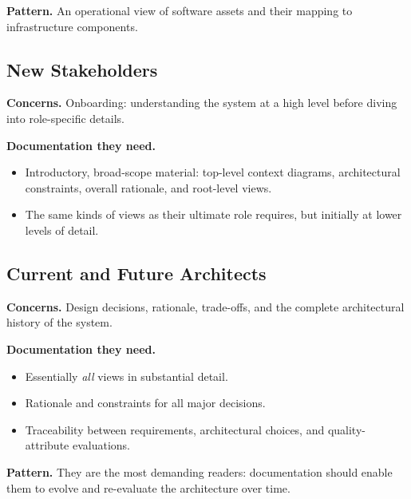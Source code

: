 \documentclass[11pt]{article}
\begin{document}
\noindent
\textbf{Pattern.} An operational view of software assets and their mapping to infrastructure components.

\subsection{New Stakeholders}

\textbf{Concerns.} Onboarding: understanding the system at a high level before diving into role-specific details.

\medskip
\noindent
\textbf{Documentation they need.}
\begin{itemize}[noitemsep]
  \item Introductory, broad-scope material: top-level context diagrams, architectural constraints, overall rationale, and root-level views.
  \item The same kinds of views as their ultimate role requires, but initially at lower levels of detail.
\end{itemize}

\subsection{Current and Future Architects}

\textbf{Concerns.} Design decisions, rationale, trade-offs, and the complete architectural history of the system.

\medskip
\noindent
\textbf{Documentation they need.}
\begin{itemize}[noitemsep]
  \item Essentially \emph{all} views in substantial detail.
  \item Rationale and constraints for all major decisions.
  \item Traceability between requirements, architectural choices, and quality-attribute evaluations.
\end{itemize}

\noindent
\textbf{Pattern.} They are the most demanding readers: documentation should enable them to evolve and re-evaluate the architecture over time.
\end{document}
